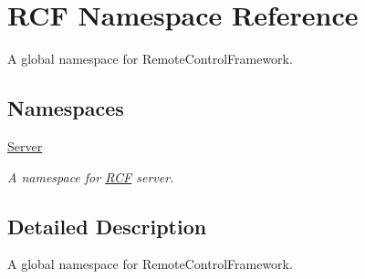 \hypertarget{namespace_r_c_f}{}\section{R\+C\+F Namespace Reference}
\label{namespace_r_c_f}


A global namespace for Remote\+Control\+Framework.  


\subsection*{Namespaces}
\begin{DoxyCompactItemize}
\item 
 \hyperlink{namespace_r_c_f_1_1_server}{Server}
\begin{DoxyCompactList}\small\item\em A namespace for \hyperlink{namespace_r_c_f}{R\+C\+F} server. \end{DoxyCompactList}\end{DoxyCompactItemize}


\subsection{Detailed Description}
A global namespace for Remote\+Control\+Framework. 